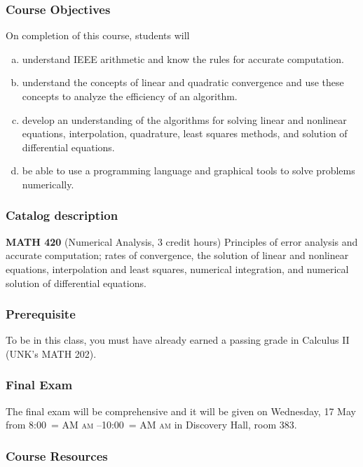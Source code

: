 \documentclass[12pt,fullpage]{article}
\makeatletter
\newcounter{ex}\setcounter{ex}{0}
\newenvironment{alphalist}{
  \begin{enumerate}[(a)]
    \addtolength{\itemsep}{-0.5\itemsep}}
  {\end{enumerate}}
\DeclareRobustCommand{\maybefakesc}[1]{%
  \ifnum\pdfstrcmp{\f@series}{\bfdefault}=\z@
    {\fontsize{\dimexpr0.8\dimexpr\f@size pt\relax}{0}\selectfont\uppercase{#1}}%
  \else
    \textsc{#1}%
  \fi
}
\newcommand\AM{\,\maybefakesc{am}\xspace}
\newcommand{\room}{Discovery Hall, room  383}
\newcommand{\finalexam}{The final exam will be comprehensive and it 
will be given on Wednesday, 17 May from 8:00\AM{}--10:00\AM}
\makeatother
\begin{document}
\subsubsection*{Course Objectives}

On completion of this course, students will
\begin{alphalist}
    \item understand IEEE arithmetic and know the rules for accurate computation.
    \item understand the concepts of linear and quadratic convergence and use these concepts to analyze 
        the efficiency of an algorithm.
    \item develop an understanding of the algorithms for solving linear and nonlinear equations, interpolation, 
       quadrature, least squares methods, and solution of differential equations.
    \item be able to use a programming language and graphical tools to solve problems 
    numerically.
\end{alphalist}

\subsubsection*{Catalog description}

    \textbf{MATH 420} (Numerical Analysis, 3 credit hours) Principles of
    error analysis and accurate computation; rates of convergence, the solution 
    of linear and nonlinear equations, interpolation and least squares, 
    numerical integration, and numerical solution of differential equations.


\subsubsection*{Prerequisite}

To be in this class, you must have already earned a passing grade in Calculus II (UNK's MATH 202).

\subsubsection*{Final Exam}

\finalexam{} in \room.

\subsubsection*{Course Resources}
\end{document}
